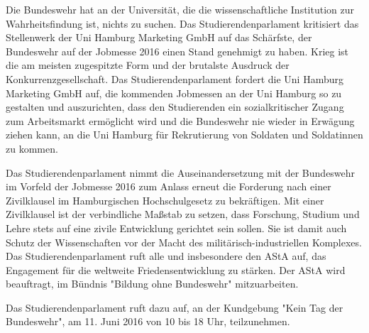 \documentclass[ngerman,headheight=70pt]{scrartcl}
\begin{document}
    Die Bundeswehr hat an der Universität, die die wissenschaftliche Institution
    zur Wahrheitsfindung ist, nichts zu suchen. Das Studierendenparlament
    kritisiert das Stellenwerk der Uni Hamburg Marketing GmbH auf das Schärfste,
    der Bundeswehr auf der Jobmesse 2016 einen Stand genehmigt zu haben.
    Krieg ist die am meisten zugespitzte Form und der brutalste Ausdruck der
    Konkurrenzgesellschaft. Das Studierendenparlament fordert die Uni Hamburg
    Marketing GmbH auf, die kommenden Jobmessen an der Uni Hamburg so zu
    gestalten und auszurichten, dass den Studierenden ein sozialkritischer Zugang
    zum Arbeitsmarkt ermöglicht wird und die Bundeswehr nie wieder in Erwägung
    ziehen kann, an die Uni Hamburg für Rekrutierung von Soldaten und Soldatinnen
    zu kommen.

    Das Studierendenparlament nimmt die Auseinandersetzung mit der Bundeswehr im
    Vorfeld der Jobmesse 2016 zum Anlass erneut die Forderung nach einer
    Zivilklausel im Hamburgischen Hochschulgesetz zu bekräftigen. Mit einer
    Zivilklausel ist der verbindliche Maßstab zu setzen, dass Forschung, Studium
    und Lehre stets auf eine zivile Entwicklung gerichtet sein sollen. Sie ist
    damit auch Schutz der Wissenschaften vor der Macht des
    militärisch-industriellen Komplexes. Das Studierendenparlament ruft alle und
    insbesondere den AStA auf, das Engagement für die weltweite
    Friedensentwicklung zu stärken. Der AStA wird beauftragt, im Bündnis
    "Bildung ohne Bundeswehr" mitzuarbeiten.

    Das Studierendenparlament ruft dazu auf, an der Kundgebung "Kein Tag der Bundeswehr",
    am 11. Juni 2016 von 10 bis 18 Uhr, teilzunehmen.
\end{document}
